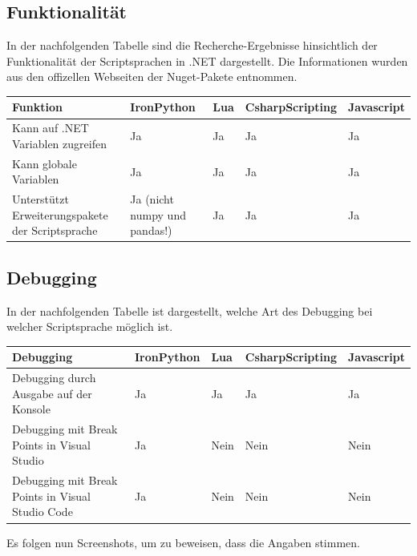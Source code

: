 \newpage
\subsection{Funktionalität}
In der nachfolgenden Tabelle sind die Recherche-Ergebnisse hinsichtlich der Funktionalität der Scriptsprachen in .NET dargestellt.
Die Informationen wurden aus den offizellen Webseiten der Nuget-Pakete entnommen.

\begin{table}[H]
    \begin{tabular}{|p{3cm}|p{3cm}|p{3cm}|p{3cm}|p{3cm}|}
        \hline
        Funktion & IronPython & Lua & CsharpScripting & Javascript\\ \hline
        Kann auf .NET Variablen zugreifen & Ja & Ja & Ja & Ja \\ \hline
        Kann globale Variablen & Ja & Ja & Ja & Ja \\ \hline
        Unterstützt Erweiterungspakete der Scriptsprache & Ja (nicht numpy und pandas!) & Ja & Ja & Ja \\ \hline 
    \end{tabular} 
\end{table}
\newpage
\subsection{Debugging}
In der nachfolgenden Tabelle ist dargestellt, welche Art des Debugging bei welcher Scriptsprache möglich ist.

\begin{table}[H]
    \begin{tabular}{|p{2.5cm}|p{2.5cm}|p{2.5cm}|p{2.5cm}|p{2.5cm}|}
        \hline
        Debugging & IronPython & Lua & CsharpScripting & Javascript\\ \hline
        Debugging durch Ausgabe auf der Konsole & Ja & Ja & Ja & Ja \\ \hline
        Debugging mit Break Points in Visual Studio & Ja & Nein & Nein & Nein\\ \hline
        Debugging mit Break Points in Visual Studio Code & Ja & Nein & Nein & Nein \\ \hline
    \end{tabular}
\end{table}

Es folgen nun Screenshots, um zu beweisen, dass die Angaben stimmen.


